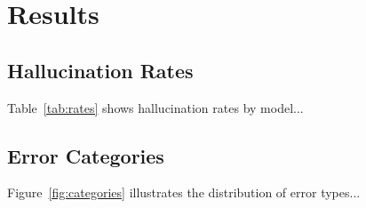 \section{Results}

\subsection{Hallucination Rates}
Table~\ref{tab:rates} shows hallucination rates by model...

\subsection{Error Categories}
Figure~\ref{fig:categories} illustrates the distribution of error types...
